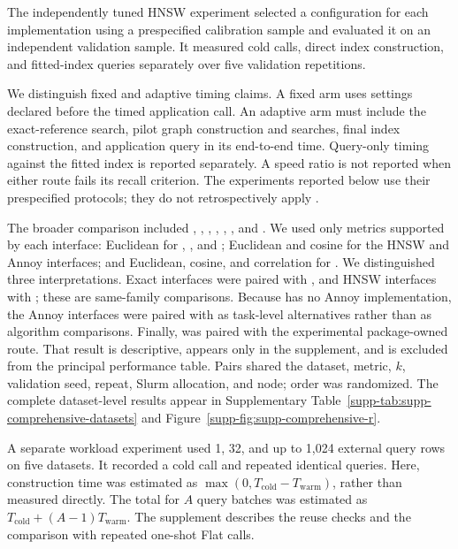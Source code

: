 \documentclass[article]{jss}
\newcommand{\fct}[1]{\code{#1()}}
\begin{document}
The independently tuned HNSW experiment selected a configuration for each
implementation using a prespecified calibration sample and evaluated it on an
independent validation sample. It measured cold calls, direct index
construction, and fitted-index queries separately over five validation
repetitions.

We distinguish fixed and adaptive timing claims. A fixed arm uses settings
declared before the timed application call. An adaptive arm must include the
exact-reference search, pilot graph construction and searches, final index
construction, and application query in its end-to-end time. Query-only timing
against the fitted index is reported separately. A speed ratio is not reported
when either route fails its recall criterion. The experiments reported below
use their prespecified protocols; they do not retrospectively apply
\fct{hnsw\_tune}.

The broader comparison included , , ,
, , , and .
We used only metrics supported by each interface: Euclidean for ,
, and ; Euclidean and cosine for the HNSW and Annoy
interfaces; and Euclidean, cosine, and correlation for .
We distinguished three interpretations. Exact interfaces were paired with
, and HNSW interfaces with ; these are same-family
comparisons. Because  has no Annoy implementation, the Annoy
interfaces were paired with  as task-level
alternatives rather than as algorithm comparisons. Finally,
 was paired with the experimental package-owned
 route. That result is descriptive, appears only in
the supplement, and is excluded from the principal performance table. Pairs
shared the dataset, metric, $k$, validation seed, repeat, Slurm allocation,
and node; order was randomized. The complete dataset-level results appear in
Supplementary Table~\ref{supp-tab:supp-comprehensive-datasets} and
Figure~\ref{supp-fig:supp-comprehensive-r}.

A separate workload experiment used 1, 32, and up to 1,024 external query rows
on five datasets. It recorded a cold call and repeated identical queries.
Here, construction time was estimated as
$\max(0,T_{\mathrm{cold}}-T_{\mathrm{warm}})$, rather than measured directly.
The total for $A$ query batches was estimated as
$T_{\mathrm{cold}}+(A-1)T_{\mathrm{warm}}$. The supplement describes the
reuse checks and the comparison with repeated one-shot Flat calls.
\end{document}

